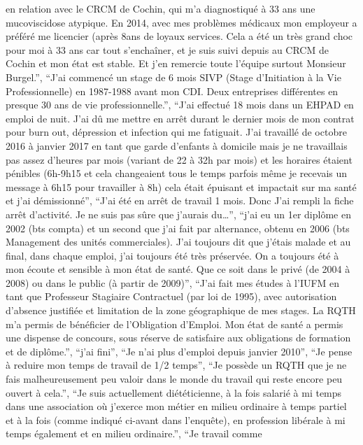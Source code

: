 \documentclass[
  letterpaper,
  DIV=11,
  numbers=noendperiod]{scrartcl}
\begin{document}
\begin{itemize}
  en relation avec le CRCM de Cochin, qui m'a diagnostiqué à 33 ans une
  mucoviscidose atypique. En 2014, avec mes problèmes médicaux mon
  employeur a préféré me licencier (après 8ans de loyaux services. Cela
  a été un très grand choc pour moi à 33 ans car tout s'enchaîner, et je
  suis suivi depuis au CRCM de Cochin et mon état est stable. Et j'en
  remercie toute l'équipe surtout Monsieur Burgel.'', ``J'ai commencé un
  stage de 6 mois SIVP (Stage d'Initiation à la Vie Professionnelle) en
  1987-1988 avant mon CDI. Deux entreprises différentes en presque 30
  ans de vie professionnelle.'', ``J'ai effectué 18 mois dans un EHPAD
  en emploi de nuit. J'ai dû me mettre en arrêt durant le dernier mois
  de mon contrat pour burn out, dépression et infection qui me
  fatiguait. J'ai travaillé de octobre 2016 à janvier 2017 en tant que
  garde d'enfants à domicile mais je ne travaillais pas assez d'heures
  par mois (variant de 22 à 32h par mois) et les horaires étaient
  pénibles (6h-9h15 et cela changeaient tous le temps parfois même je
  recevais un message à 6h15 pour travailler à 8h) cela était épuisant
  et impactait sur ma santé et j'ai démissionné'', ``J'ai été en arrêt
  de travail 1 mois. Donc J'ai rempli la fiche arrêt d'activité. Je ne
  suis pas sûre que j'aurais du\ldots{}'', ``j'ai eu un 1er diplôme en
  2002 (bts compta) et un second que j'ai fait par alternance, obtenu en
  2006 (bts Management des unités commerciales). J'ai toujours dit que
  j'étais malade et au final, dans chaque emploi, j'ai toujours été très
  préservée. On a toujours été à mon écoute et sensible à mon état de
  santé. Que ce soit dans le privé (de 2004 à 2008) ou dans le public (à
  partir de 2009)'', ``J'ai fait mes études à l'IUFM en tant que
  Professeur Stagiaire Contractuel (par loi de 1995), avec autorisation
  d'absence justifiée et limitation de la zone géographique de mes
  stages. La RQTH m'a permis de bénéficier de l'Obligation d'Emploi. Mon
  état de santé a permis une dispense de concours, sous réserve de
  satisfaire aux obligations de formation et de diplôme.'', ``j'ai
  fini'', ``Je n'ai plus d'emploi depuis janvier 2010'', ``Je pense à
  reduire mon temps de travail de 1/2 temps'', ``Je possède un RQTH que
  je ne fais malheureusement peu valoir dans le monde du travail qui
  reste encore peu ouvert à cela.'', ``Je suis actuellement
  diététicienne, à la fois salarié à mi temps dans une association où
  j'exerce mon métier en milieu ordinaire à temps partiel et à la fois
  (comme indiqué ci-avant dans l'enquête), en profession libérale à mi
  temps également et en milieu ordinaire.'', ``Je travail comme

\end{itemize}
\end{document}
